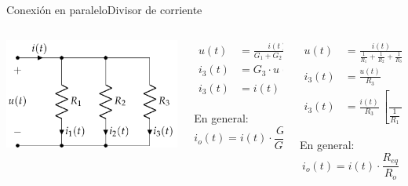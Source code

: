 \documentclass[aspectratio=169, xcolor={usenames,svgnames,dvipsnames}]{beamer}
\begin{document}
\begin{frame}{Conexión en paralelo}{Divisor de corriente}
\begin{columns}
\begin{column}{0.33\columnwidth}
\begin{center}
\includegraphics[width=\linewidth]{../figs/AsociacionParalelo.pdf}
\end{center}
\end{column}
\begin{column}{0.33\columnwidth}
\begin{align*}
  u(t) &= \frac{i(t)}{G_1 + G_2 + G_3}\\
  i_3(t) &= G_3 \cdot u(t)\\
  i_3(t)& = i(t) \, \frac{G_3}{G_1 + G_2 + G_3}  
\end{align*}

En general:
\begin{equation*}
  \boxed{i_o(t) = i(t) \cdot \frac{G_o}{G_{eq}}}
\end{equation*}
\end{column}
\begin{column}{0.33\columnwidth}

\begin{align*}
  u(t) &= \frac{i(t)}{\frac{1}{R_1}+\frac{1}{R_2}+\frac{1}{R_3}}\\
  i_3(t) &= \frac{u(t)}{R_3} \\
  i_3(t) &= \frac{i(t)}{R_3} \, \left[\dfrac{1}{ \frac{1}{R_1}+\frac{1}{R_2}+\frac{1}{R_3}}  \right]
\end{align*}

En general:
\begin{equation*}
  \boxed{i_o(t) = i(t)\cdot \frac{R_{eq}}{R_o}}
\end{equation*}
\end{column}
\end{columns}
\end{frame}
\end{document}
